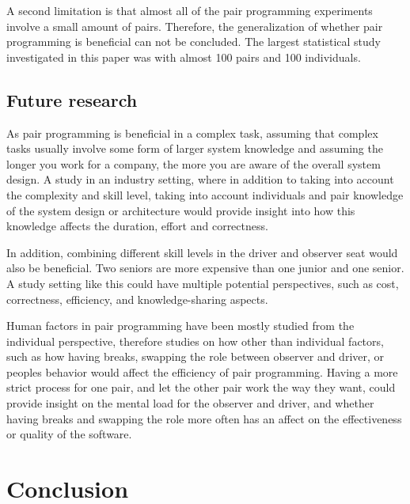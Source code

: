 \documentclass[conference]{IEEEtran}
\begin{document}
A second limitation is that almost all of the pair programming experiments involve a small amount of pairs. Therefore, the generalization of whether pair programming is beneficial can not be concluded. The largest statistical study investigated in this paper was \cite{Arisholm2007Evaluating} with almost 100 pairs and 100 individuals. 


\subsection{Future research}

As pair programming is beneficial in a complex task, assuming that complex tasks usually involve some form of larger system knowledge and assuming the longer you work for a company, the more you are aware of the overall system design. A study in an industry setting, where in addition to taking into account the complexity and skill level, taking into account individuals and pair knowledge of the system design or architecture would provide insight into how this knowledge affects the duration, effort and correctness.

In addition, combining different skill levels in the driver and observer seat would also be beneficial. Two seniors are more expensive than one junior and one senior. A study setting like this could have multiple potential perspectives, such as cost, correctness, efficiency, and knowledge-sharing aspects.

Human factors in pair programming have been mostly studied from the individual perspective, therefore studies on how other than individual factors, such as how having breaks, swapping the role between observer and driver, or peoples behavior would affect the efficiency of pair programming. Having a more strict process for one pair, and let the other pair work the way they want, could provide insight on the mental load for the observer and driver, and whether having breaks and swapping the role more often has an affect on the effectiveness or quality of the software.

\section{Conclusion}
\end{document}
